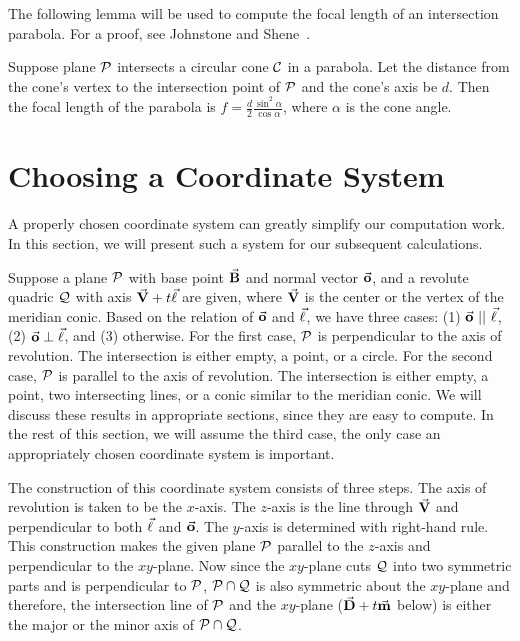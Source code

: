      The following lemma will be used to compute the focal length of an
intersection parabola.  For a proof, see Johnstone and 
Shene~\cite{johnstone-shene:1991}.

\begin{lemma}
\label{lemma:cone-para-focal-length}
     Suppose plane ${\cal P}$ intersects a circular cone ${\cal C}$ in a
parabola.  Let the distance from the cone's vertex to the intersection point
of ${\cal P}$ and the cone's axis be $d$.  Then the focal length of the 
parabola is $f=\frac{d}{2}\frac{\sin^2\alpha}{\cos\alpha}$, where $\alpha$ is
the cone angle.
\end{lemma}


\section{Choosing a Coordinate System}
\label{section:coordinate-system}

     A properly chosen coordinate system can greatly simplify our computation
work.  In this section,  we will present such a system for our subsequent
calculations.

     Suppose a plane ${\cal P}$ with base point $\vec{\bf B}$ and normal vector
$\vec{\bf o}$, and a revolute quadric ${\cal Q}$ with axis 
$\vec{\bf V}+t\vec{\bf \ell}$ are given, where $\vec{\bf V}$ is the center or the 
vertex of the meridian conic.
Based on the relation of $\vec{\bf o}$ and $\vec{\bf \ell}$, we have three cases:
(1) $\vec{\bf o}\ ||\ \vec{\bf \ell}$, (2) $\vec{\bf o}\perp\vec{\bf \ell}$, and
(3) otherwise.  For the first case, ${\cal P}$ is perpendicular to the
axis of revolution.  The intersection is either empty, a point, or a circle.
For the second case, ${\cal P}$ is parallel to the axis of revolution.  The
intersection is either empty, a point, two intersecting lines, or a conic
similar to the meridian conic.  We will discuss these results in appropriate
sections, since they are easy to compute.  In the rest of this section, 
we will assume the
third case, the only case an appropriately chosen coordinate system is
important.

     The construction of this coordinate system consists of three steps.  
The axis of revolution is taken to be the $x$-axis.  The $z$-axis is the
line through $\vec{\bf V}$ and perpendicular to both $\vec{\bf \ell}$ and
$\vec{\bf o}$.  The $y$-axis is determined with right-hand rule.
This construction makes the given plane ${\cal P}$ parallel to the $z$-axis
and perpendicular to the $xy$-plane.  Now since the $xy$-plane cuts 
${\cal Q}$ into two symmetric parts and is perpendicular to ${\cal P}$,
${\cal P}\cap{\cal Q}$ is also symmetric about the $xy$-plane and therefore,
the intersection line of ${\cal P}$ and the $xy$-plane
($\vec{\bf D}+t\vec{\bf m}$ below) is either the major or the minor axis of
${\cal P}\cap{\cal Q}$.

